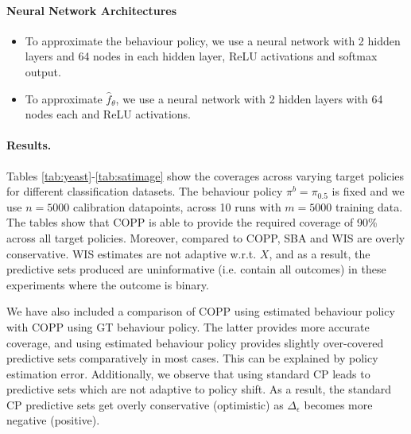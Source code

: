 \paragraph{Neural Network Architectures}
\begin{itemize}
    \item To approximate the behaviour policy, we use a neural network with 2 hidden layers and 64 nodes in each hidden layer, ReLU activations and softmax output.
    \item To approximate $\hat{f}_{\theta}$, we use a neural network with 2 hidden layers with 64 nodes each and ReLU activations.
\end{itemize}


\paragraph{Results.} Tables \ref{tab:yeast}-\ref{tab:satimage} show the coverages across varying target policies for different classification datasets. The behaviour policy $\pi^b = \pi_{0.5}$ is fixed and we use $n=5000$ calibration datapoints, across 10 runs with $m=5000$ training data. The tables show that COPP is able to provide the required coverage of 90\% across all target policies. Moreover, compared to COPP, SBA and WIS are overly conservative. WIS estimates are not adaptive w.r.t. $X$, and as a result, the predictive sets produced are uninformative (i.e. contain all outcomes) in these experiments where the outcome is binary. 

We have also included a comparison of COPP using estimated behaviour policy with COPP using GT behaviour policy. The latter provides more accurate coverage, and using estimated behaviour policy provides slightly over-covered predictive sets comparatively in most cases. This can be explained by policy estimation error. Additionally, we observe that using standard CP leads to predictive sets which are not adaptive to policy shift. As a result, the standard CP predictive sets get overly conservative (optimistic) as $\Delta_\epsilon$ becomes more negative (positive).

